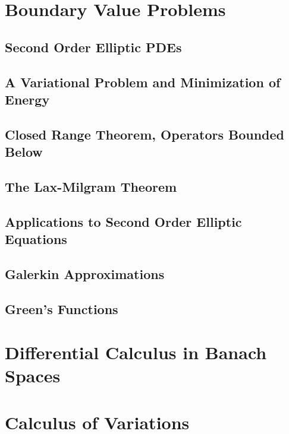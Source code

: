 \documentclass[letterpaper,twoside,12pt]{article}
\theoremstyle{mystyle}
\begin{document}
\newpage\section{Boundary Value Problems}
\subsection{Second Order Elliptic PDEs}
\subsection{A Variational Problem and Minimization of Energy}
\subsection{Closed Range Theorem, Operators Bounded Below}
\subsection{The Lax-Milgram Theorem}
\subsection{Applications to Second Order Elliptic Equations}
\subsection{Galerkin Approximations}
\subsection{Green's Functions}

\newpage\section{Differential Calculus in Banach Spaces}
\newpage\section{Calculus of Variations }
\end{document}
